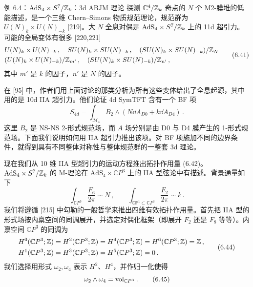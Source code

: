 \begin{examplebox}{例 6.4：$\mathrm{AdS}_4 \times S^7/\mathbb{Z}_k$：3d ABJM 理论}
探测 $\mathbb{C}^4/\mathbb{Z}_k$ 奇点的 $N$ 个 M2-膜堆的低能描述，是一个三维 Chern--Simons 物质规范理论，规范群为 $U(N)_k \times U(N)_{-k}$ [219]。大 $N$ 全息对偶是 $\mathrm{AdS}_4 \times S^7/\mathbb{Z}_k$ 上的 11d 超引力。可能的全局变体有很多 [220,221]
\begin{equation}
\begin{aligned}
&U(N)_k \times U(N)_{-k}\,,\quad SU(N)_k \times SU(N)_{-k}\,,\quad (SU(N)_k \times SU(N)_{-k})/\mathbb{Z}_N\\
&(U(N)_k \times U(N)_{-k})/\mathbb{Z}_{m'}\,,\quad (SU(N)_k \times SU(N)_{-k})/\mathbb{Z}_{n'}\,,
\end{aligned}\tag{6.41}
\end{equation}
其中 $m'$ 是 $k$ 的因子，$n'$ 是 $N$ 的因子。

在 [95] 中，作者们用上面讨论的那类分析为所有这些变体给出了全息起源，其中用的是 10d IIA 超引力。他们论证 4d SymTFT 含有一个 BF 项
\begin{equation}
  S_{4d} = \int_{\mathcal{M}_4} B_2 \wedge \left(N \dd A_{D0} + k \dd A_{D4}\right)\,. \tag{6.42}
\end{equation}
这里 $B_2$ 是 NS-NS 2-形式规范场，而 $A$ 场分别是由 D0 与 D4 膜产生的 1-形式规范场。下面我们说明如何用 IIA 超引力推出该项。对 BF 项施加不同的边界条件，就得到具有不同整体对称性与整体规范群的一整套 3d 理论。

现在我们从 10 维 IIA 型超引力的运动方程推出拓扑作用量 (6.42)。$\mathrm{AdS}_4 \times S^7/\mathbb{Z}_k$ 的 M-理论在 $\mathrm{AdS}_4 \times \mathbb{C}P^3$ 上的 IIA 型弦论中有描述。背景通量如下
\begin{equation}
  \int_{\mathbb{C}P^3} \frac{F_6}{2\pi} \sim N\,,\qquad \int_{\mathbb{CP}^1 \subset \mathbb{C}P^3} \frac{F_2}{2\pi} \sim k\,. \tag{6.43}
\end{equation}
我们将遵循 [215] 中勾勒的一般哲学来推出四维有效拓扑作用量。首先把 IIA 型的形式场按内禀空间的同调展开，并选定对偶化框架（即展开 $F_2$ 还是 $F_8$ 等等）。内禀空间 $\mathbb{C}P^3$ 的同调为
\begin{equation}
\begin{aligned}
H^0(\mathbb{C}P^3;\mathbb{Z}) &= H^2(\mathbb{C}P^3;\mathbb{Z}) = H^4(\mathbb{C}P^3;\mathbb{Z}) = H^6(\mathbb{C}P^3;\mathbb{Z}) = \mathbb{Z}\,,\\
H^1(\mathbb{C}P^3;\mathbb{Z}) &= H^3(\mathbb{C}P^3;\mathbb{Z}) = H^5(\mathbb{C}P^3;\mathbb{Z}) = 0\,.
\end{aligned}\tag{6.44}
\end{equation}
我们选择用形式 $\omega_2,\omega_4$ 表示 $H^2$、$H^4$，并作归一化使得
\begin{equation}
  \omega_2 \wedge \omega_4 = \operatorname{vol}_{\mathbb{C}P^3}\,. \tag{6.45}
\end{equation}


\end{examplebox}
